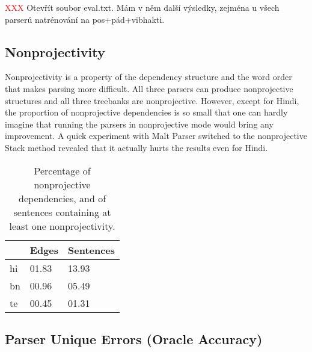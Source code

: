 \documentclass[11pt]{article}
\newcommand{\hi}[1]{{\hifont #1}}
\newcommand{\bn}[1]{{\bnfont #1}}
\newcommand{\te}[1]{{\tefont #1}}
\newcommand{\translit}[1]{{\translitfont \textit{#1}}}
\newcommand{\XXX}{\textcolor{red}{XXX }} %
\begin{document}
\XXX Otevřít soubor eval.txt. Mám v něm další výsledky, zejména u všech parserů natrénování na pos+pád+vibhakti.


\subsection{Nonprojectivity}
\label{sec:nonprojectivity}

Nonprojectivity is a property of the dependency structure and the word order \citep{neproj} that makes parsing more difficult. All three parsers can produce nonprojective structures and all three treebanks are nonprojective. However, except for Hindi, the proportion of nonprojective dependencies is so small that one can hardly imagine that running the parsers in nonprojective mode would bring any improvement. A quick experiment with Malt Parser switched to the nonprojective Stack method revealed that it actually hurts the results even for Hindi.

\begin{table}[ht]
\begin{centering}
\begin{tabular}{l|ll}
& \textbf{Edges} & \textbf{Sentences} \\
\hline
hi & 01.83 & 13.93\\
bn & 00.96 & 05.49\\
te & 00.45 & 01.31\\
\end{tabular}
\caption{Percentage of nonprojective dependencies, and of sentences containing at least one nonprojectivity.}
\label{tab:nonprojectivity}
\end{centering}
\end{table}

\subsection{Parser Unique Errors (Oracle Accuracy)}
\end{document}
